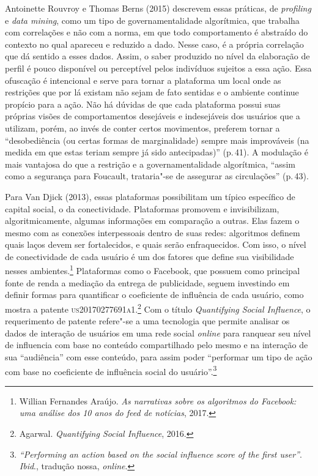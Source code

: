 Antoinette Rouvroy e Thomas Berns (2015) descrevem essas práticas, 
de \emph{profiling} e \emph{data mining}, como um tipo de
governamentalidade algorítmica, que trabalha com correlações e não com a
norma, em que todo comportamento é abstraído do contexto no qual
apareceu e reduzido a dado. Nesse caso, é a própria correlação que dá
sentido a esses dados. Assim, o saber produzido no nível da elaboração
de perfil é pouco disponível ou perceptível pelos indivíduos sujeitos a
essa ação. Essa ofuscação é intencional e serve para tornar a plataforma
um local onde as restrições que por lá existam não sejam de fato
sentidas e o ambiente continue propício para a ação. Não há dúvidas de
que cada plataforma possui suas próprias visões de comportamentos
desejáveis e indesejáveis dos usuários que a utilizam, porém, ao invés
de conter certos movimentos, preferem tornar a ``desobediência (ou
certas formas de marginalidade) sempre mais improváveis (na medida em
que estas teriam sempre já sido antecipadas)'' (p.\,41). A modulação é mais
vantajosa do que a restrição e a governamentalidade algorítmica, ``assim
como a segurança para Foucault, trataria"-se de assegurar as
circulações'' (p.\,43).

Para Van Djick (2013), essas plataformas possibilitam um típico
específico de capital social, o da conectividade. Plataformas promovem e
invisibilizam, algoritmicamente, algumas informações em comparação a
outras. Elas fazem o mesmo com as conexões interpessoais dentro de suas
redes: algoritmos definem quais laços devem ser fortalecidos, e quais
serão enfraquecidos. Com isso, o nível de conectividade de cada usuário
é um dos fatores que define sua visibilidade nesses ambientes.\footnote{Willian Fernandes Araújo. \emph{As narrativas sobre os algoritmos do Facebook: uma
análise dos 10 anos do feed de notícias}, 2017.} %
Plataformas como o Facebook, que possuem como
principal fonte de renda a mediação da entrega de publicidade, seguem
investindo em definir formas para quantificar o coeficiente de
influência de cada usuário, como mostra a patente \textsc{us20170277691a1}.\footnote{Agarwal. \emph{Quantifying Social Influence}, 2016.}
Com o título \emph{Quantifying Social Influence}, o
requerimento de patente refere"-se a uma tecnologia que permite analisar
os dados de interação de usuários em uma rede social \emph{online} para
ranquear seu nível de influencia com base no conteúdo compartilhado pelo
mesmo e na interação de sua ``audiência'' com esse conteúdo, para assim
poder ``performar um tipo de ação com base no coeficiente de influência
social do usuário''.\footnote{\emph{``Performing an action based on the social influence score of the first user''}. \textit{Ibid}., tradução nossa, \emph{online}.}

